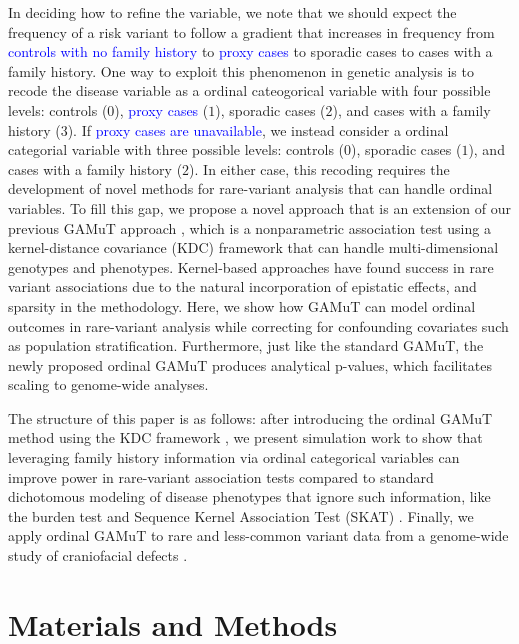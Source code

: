 \documentclass[]{article}
\begin{document}
In deciding how to refine the variable, we note that we should expect the frequency of a risk variant to follow a gradient that increases in frequency from \textcolor{blue}{controls with no family history} to \textcolor{blue}{proxy cases} to sporadic cases to cases with a family history. One way to exploit this phenomenon in genetic analysis is to recode the disease variable as a ordinal cateogorical variable with four possible levels: controls (\(0\)), \textcolor{blue}{proxy cases} (\(1\)), sporadic cases (\(2\)), and cases with a family history (\(3\)). If \textcolor{blue}{proxy cases are unavailable}, we instead consider a ordinal categorial variable with three possible levels: controls (\(0\)), sporadic cases (\(1\)), and cases with a family history (\(2\)). In either case, this recoding requires the development of novel methods for rare-variant analysis that can handle ordinal variables. To fill this gap, we propose a novel approach that is an extension of our previous GAMuT approach \citep{Broadaway2016}, which is a nonparametric association test using a kernel-distance covariance (KDC) framework that can handle multi-dimensional genotypes and phenotypes.
Kernel-based approaches have found success in rare variant associations due to the natural incorporation of epistatic effects, and sparsity in the methodology.
Here, we show how GAMuT can model ordinal outcomes in rare-variant analysis while correcting for confounding covariates such as population stratification. Furthermore, just like the standard GAMuT, the newly proposed ordinal GAMuT produces analytical p-values, which facilitates scaling to genome-wide analyses.

The structure of this paper is as follows: after introducing the ordinal GAMuT method using the KDC framework
\citep{Gretton2008, Szekely2007, Kosorok2009, Zhang2012, Hua2015}, we present simulation work to
show that leveraging family history information via
ordinal categorical variables can improve power in
rare-variant association tests compared to standard dichotomous
modeling of disease phenotypes that ignore such information, like the burden test \citep{Li2008, Madsen2009} and Sequence Kernel Association Test (SKAT) \citep{Wu2011}.
Finally, we apply ordinal GAMuT to rare and less-common variant data from a genome-wide study of craniofacial defects
\citep{Leslie2016, Leslie2016b, Mostowska2018}.

\hypertarget{materials-and-methods}{%
\section{Materials and Methods}\label{materials-and-methods}}
\end{document}

